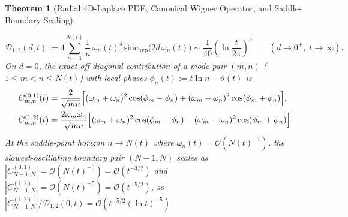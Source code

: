 \documentclass[11pt,reqno]{amsart}
\newtheorem{theorem}{Theorem}[section]
\theoremstyle{definition}
\theoremstyle{remark}
\numberwithin{equation}{section}
\newcommand{\sinch}{\mathrm{sinc}_{\mathrm{hyp}}}
\begin{document}
\begin{theorem}[Radial 4D-Laplace PDE, Canonical Wigner Operator, and Saddle-Boundary Scaling]
\begin{enumerate}[label=\textup{(\roman*)},leftmargin=2.2em]
\begin{equation}\label{eq:W12_diagonal_lnt5}
\mathcal{D}_{1,2}(d,t) := 4\sum_{n=1}^{N(t)} \frac{1}{n}\,\omega_n(t)^4\,\sinch\bigl(2d\,\omega_n(t)\bigr) \sim \frac{1}{40}\left(\ln\frac{t}{2\pi}\right)^5 \qquad (d \to 0^+,\; t \to \infty).
\end{equation}
On $d = 0$, the exact off-diagonal contribution of a mode pair $(m,n)$ ($1 \le m < n \le N(t)$) with local phases $\phi_n(t) := t\ln n - \vartheta(t)$ is
\begin{equation}\label{eq:exact_cross_terms}
\begin{aligned}
C_{m,n}^{(0,1)}(t) &= \frac{2}{\sqrt{mn}}\Bigl[(\omega_m + \omega_n)^2\cos(\phi_m - \phi_n) + (\omega_m - \omega_n)^2\cos(\phi_m + \phi_n)\Bigr], \\
C_{m,n}^{(1,2)}(t) &= \frac{2\omega_m\omega_n}{\sqrt{mn}}\Bigl[(\omega_m + \omega_n)^2\cos(\phi_m - \phi_n) - (\omega_m - \omega_n)^2\cos(\phi_m + \phi_n)\Bigr].
\end{aligned}
\end{equation}
At the saddle-point horizon $n \to N(t)$ where $\omega_n(t) = \mathcal{O}(N(t)^{-1})$, the slowest-oscillating boundary pair $(N-1, N)$ scales as $|C_{N-1,N}^{(0,1)}| = \mathcal{O}(N(t)^{-3}) = \mathcal{O}(t^{-3/2})$ and $|C_{N-1,N}^{(1,2)}| = \mathcal{O}(N(t)^{-5}) = \mathcal{O}(t^{-5/2})$, so $|C_{N-1,N}^{(1,2)}|/\mathcal{D}_{1,2}(0,t) = \mathcal{O}(t^{-5/2}(\ln t)^{-5})$.
\end{enumerate}
\end{theorem}
\end{document}
